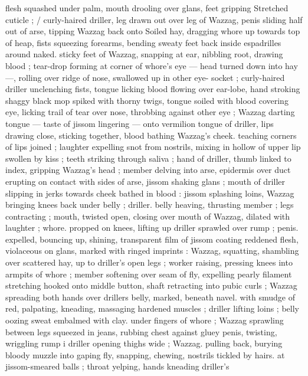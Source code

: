 flesh squashed under palm, mouth drooling over glans, feet gripping 
Stretched cuticle ; {\slash} curly-haired driller, leg drawn out over leg of 
Wazzag, penis sliding half out of arse, tipping Wazzag back onto 
Soiled hay, dragging whore up towards top of heap, fists squeezing 
forearms, bending sweaty feet back inside espadrilles around naked. 
sticky feet of Wazzag, snapping at ear, nibbling root, drawing blood 
; tear-drop forming at corner of whore's eye --- head turned down 
into hay ---, rolling over ridge of nose, swallowed up in other eye- 
socket ; curly-haired driller unclenching fists, tongue licking blood 
flowing over ear-lobe, hand stroking shaggy black mop spiked with 
thorny twigs, tongue soiled with blood covering eye, licking trail of 
tear over nose, throbbing against other eye ; Wazzag darting tongue 
--- taste of jissom lingering --- onto vermilion tongue of driller, lips 
drawing close, sticking together, blood bathing Wazzag's cheek. 
teaching corners of lips joined ; laughter expelling snot from 
nostrils, mixing in hollow of upper lip swollen by kiss ; teeth striking 
through saliva ; hand of driller, thumb linked to index, gripping 
Wazzag's head ; member delving into arse, epidermis over duct 
erupting on contact with sides of arse, jissom shaking glans ; mouth 
of driller slipping in jerks towards cheek bathed in blood : jissom 
splashing loins, Wazzag bringing knees back under belly ; driller. 
belly heaving, thrusting member ; legs contracting ; mouth, twisted 
open, closing over mouth of Wazzag, dilated with laughter ; whore. 
propped on knees, lifting up driller sprawled over rump ; penis. 
expelled, bouncing up, shining, transparent film of jissom coating 
reddened flesh, violaceous on glans, marked with ringed imprints : 
Wazzag, squatting, shambling over scattered hay, up to driller's open 
legs ; worker raising, pressing knees into armpits of whore ; member 
softening over seam of fly, expelling pearly filament stretching 
hooked onto middle button, shaft retracting into pubic curls ; Wazzag 
spreading both hands over drillers belly, marked, beneath navel. 
with smudge of red, palpating, kneading, massaging hardened 
muscles ; driller lifting loins ; belly oozing sweat embalmed with clay. 
under fingers of whore ; Wazzag sprawling between legs squeezed 
in jeans, rubbing chest against gluey penis, twisting, wriggling rump 
i driller opening thighs wide ; Wazzag. pulling back, burying bloody 
muzzle into gaping fly, snapping, chewing, nostrils tickled by hairs. 
at jissom-smeared balls ; throat yelping, hands kneading driller's 

